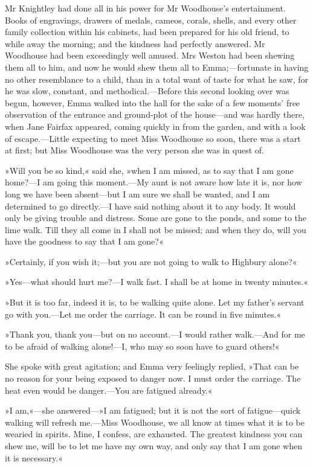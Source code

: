 Mr Knightley had done all in his power for Mr Woodhouse's entertainment. Books of engravings, drawers of medals, cameos, corals, shells, and every other family collection within his cabinets, had been prepared for his old friend, to while away the morning; and the kindness had perfectly answered. Mr Woodhouse had been exceedingly well amused. Mrs Weston had been shewing them all to him, and now he would shew them all to Emma;—fortunate in having no other resemblance to a child, than in a total want of taste for what he saw, for he was slow, constant, and methodical.—Before this second looking over was begun, however, Emma walked into the hall for the sake of a few moments' free observation of the entrance and ground-plot of the house—and was hardly there, when Jane Fairfax appeared, coming quickly in from the garden, and with a look of escape.—Little expecting to meet Miss Woodhouse so soon, there was a start at first; but Miss Woodhouse was the very person she was in quest of.

»Will you be so kind,« said she, »when I am missed, as to say that I am gone home?—I am going this moment.—My aunt is not aware how late it is, nor how long we have been absent—but I am sure we shall be wanted, and I am determined to go directly.—I have said nothing about it to any body. It would only be giving trouble and distress. Some are gone to the ponds, and some to the lime walk. Till they all come in I shall not be missed; and when they do, will you have the goodness to say that I am gone?«

»Certainly, if you wish it;—but you are not going to walk to Highbury alone?«

»Yes—what should hurt me?—I walk fast. I shall be at home in twenty minutes.«

»But it is too far, indeed it is, to be walking quite alone. Let my father's servant go with you.—Let me order the carriage. It can be round in five minutes.«

»Thank you, thank you—but on no account.—I would rather walk.—And for me to be afraid of walking alone!—I, who may so soon have to guard others!«

She spoke with great agitation; and Emma very feelingly replied, »That can be no reason for your being exposed to danger now. I must order the carriage. The heat even would be danger.—You are fatigued already.«

»I am,«—she answered—»I am fatigued; but it is not the sort of fatigue—quick walking will refresh me.—Miss Woodhouse, we all know at times what it is to be wearied in spirits. Mine, I confess, are exhausted. The greatest kindness you can shew me, will be to let me have my own way, and only say that I am gone when it is necessary.«

